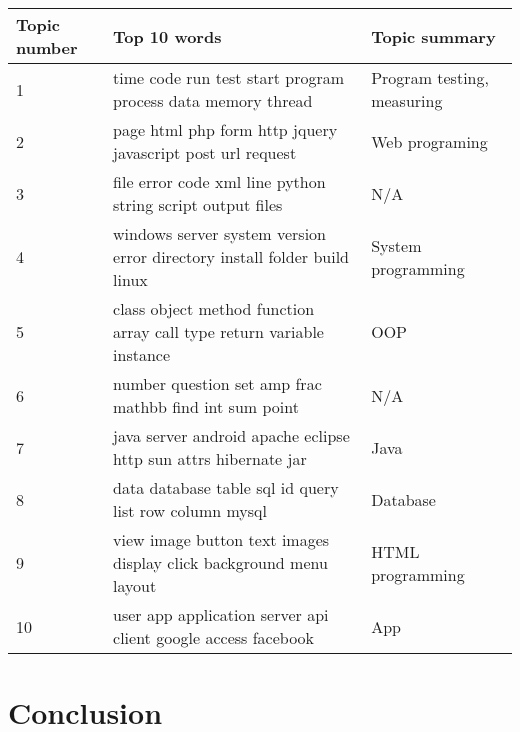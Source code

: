 \documentclass{article}
\begin{document}
\begin{center}
  \begin{tabular}{| l | l | l |}
    \hline
    Topic number & Top 10 words & Topic summary \\ \hline
    1 & time code run test start program process data memory thread & Program testing, measuring \\ \hline
    2 & page html php form http jquery javascript post url request & Web programing \\ \hline
    3 & file error code xml line python string script output files  & N/A \\ \hline
    4 & windows server system version error directory install folder build linux & System programming \\ \hline
    5 & class object method function array call type return variable instance & OOP \\ \hline
    6 & number question set amp frac mathbb find int sum point & N/A \\ \hline
    7 & java server android apache eclipse http sun attrs hibernate jar & Java \\ \hline
    8 & data database table sql id query list row column mysql & Database \\ \hline
    9 & view image button text images display click background menu layout & HTML programming \\ \hline
    10 & user app application server api client google access facebook & App \\
    \hline
  \end{tabular}
\end{center}

\section{Conclusion}


\end{document}

